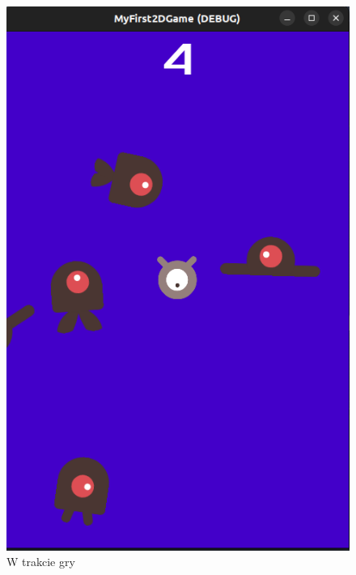 \documentclass[a4paper]{article}
\begin{document}
\begin{sloppypar}
\begin{center}
\begin{figure}
			\includegraphics[height=0.35\textheight]{game1.png}
			\caption{W trakcie gry}
		\end{figure}
		\begin{figure}
			\centering

\end{figure}
\end{center}
\end{sloppypar}
\end{document}
